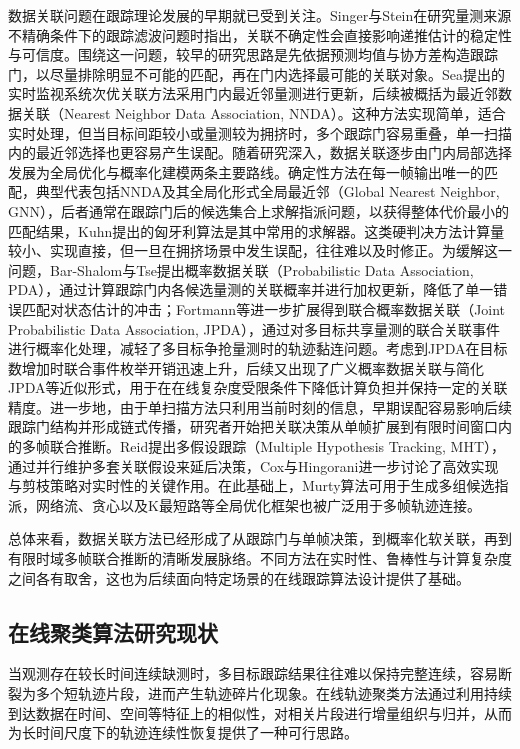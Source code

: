 \documentclass{xdupgthesis}
\begin{document}
数据关联问题在跟踪理论发展的早期就已受到关注。Singer与Stein在研究量测来源不精确条件下的跟踪滤波问题时指出，关联不确定性会直接影响递推估计的稳定性与可信度\cite{singer1971optimaltracking}。围绕这一问题，较早的研究思路是先依据预测均值与协方差构造跟踪门，以尽量排除明显不可能的匹配，再在门内选择最可能的关联对象。Sea提出的实时监视系统次优关联方法采用门内最近邻量测进行更新，后续被概括为最近邻数据关联（Nearest Neighbor Data Association, NNDA）\cite{sea1971suboptimal}。这种方法实现简单，适合实时处理，但当目标间距较小或量测较为拥挤时，多个跟踪门容易重叠，单一扫描内的最近邻选择也更容易产生误配。随着研究深入，数据关联逐步由门内局部选择发展为全局优化与概率化建模两条主要路线。确定性方法在每一帧输出唯一的匹配，典型代表包括NNDA及其全局化形式全局最近邻（Global Nearest Neighbor, GNN），后者通常在跟踪门后的候选集合上求解指派问题，以获得整体代价最小的匹配结果，Kuhn提出的匈牙利算法是其中常用的求解器\cite{kuhn1955hungarian}。这类硬判决方法计算量较小、实现直接，但一旦在拥挤场景中发生误配，往往难以及时修正。为缓解这一问题，Bar-Shalom与Tse提出概率数据关联（Probabilistic Data Association, PDA），通过计算跟踪门内各候选量测的关联概率并进行加权更新，降低了单一错误匹配对状态估计的冲击\cite{barshalom1975pda}；Fortmann等进一步扩展得到联合概率数据关联（Joint Probabilistic Data Association, JPDA），通过对多目标共享量测的联合关联事件进行概率化处理，减轻了多目标争抢量测时的轨迹黏连问题\cite{fortmann1983jpda}。考虑到JPDA在目标数增加时联合事件枚举开销迅速上升，后续又出现了广义概率数据关联与简化JPDA等近似形式，用于在在线复杂度受限条件下降低计算负担并保持一定的关联精度\cite{pan2005gpda,qin2005simplifiedjpda,sheng2020simplifiedjpda}。进一步地，由于单扫描方法只利用当前时刻的信息，早期误配容易影响后续跟踪门结构并形成链式传播，研究者开始把关联决策从单帧扩展到有限时间窗口内的多帧联合推断。Reid提出多假设跟踪（Multiple Hypothesis Tracking, MHT），通过并行维护多套关联假设来延后决策\cite{reid1979mht}，Cox与Hingorani进一步讨论了高效实现与剪枝策略对实时性的关键作用\cite{cox1996efficientmht}。在此基础上，Murty算法可用于生成多组候选指派\cite{murty1968ranking}，网络流、贪心以及K最短路等全局优化框架也被广泛用于多帧轨迹连接\cite{zhang2008networkflow,pirsiavash2011greedy,berclaz2011kshortest}。

总体来看，数据关联方法已经形成了从跟踪门与单帧决策，到概率化软关联，再到有限时域多帧联合推断的清晰发展脉络。不同方法在实时性、鲁棒性与计算复杂度之间各有取舍，这也为后续面向特定场景的在线跟踪算法设计提供了基础。

\subsection{在线聚类算法研究现状}
当观测存在较长时间连续缺测时，多目标跟踪结果往往难以保持完整连续，容易断裂为多个短轨迹片段，进而产生轨迹碎片化现象。在线轨迹聚类方法通过利用持续到达数据在时间、空间等特征上的相似性，对相关片段进行增量组织与归并，从而为长时间尺度下的轨迹连续性恢复提供了一种可行思路\cite{wang2021trajectorysurvey,wang2024reconstruction}。 
\end{document}
